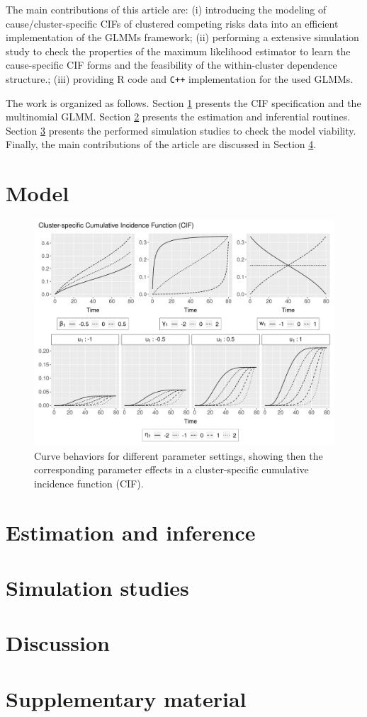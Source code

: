 \documentclass[a4paper,12pt]{article}
\begin{document}
The main contributions of this article are: (i) introducing the modeling
of cause/cluster-specific CIFs of clustered competing risks data into an
efficient implementation of the GLMMs framework; (ii) performing a
extensive simulation study to check the properties of the maximum
likelihood estimator to learn the cause-specific CIF forms and the
feasibility of the within-cluster dependence structure.; (iii) providing
R code and \texttt{C++} implementation for the used GLMMs.

The work is organized as follows. Section \ref{model} presents the CIF
specification and the multinomial GLMM. Section \ref{inference} presents
the estimation and inferential routines. Section \ref{simulation}
presents the performed simulation studies to check the model
viability. Finally, the main contributions of the article are discussed
in Section \ref{discussion}.

\section{Model}
\label{model}

\begin{figure}[H]
 \centering \includegraphics[width=\linewidth]{pics/cifstudy-1.png}
 \vspace{-0.75cm}
 \caption{Curve behaviors for different parameter settings, showing then
   the corresponding parameter effects in a cluster-specific cumulative
   incidence function (CIF).}
 \label{fig:cifcoefs}
\end{figure}

\section{Estimation and inference}
\label{inference}

\section{Simulation studies}
\label{simulation}

\section{Discussion}
\label{discussion}

\section*{Supplementary material}



\end{document}
